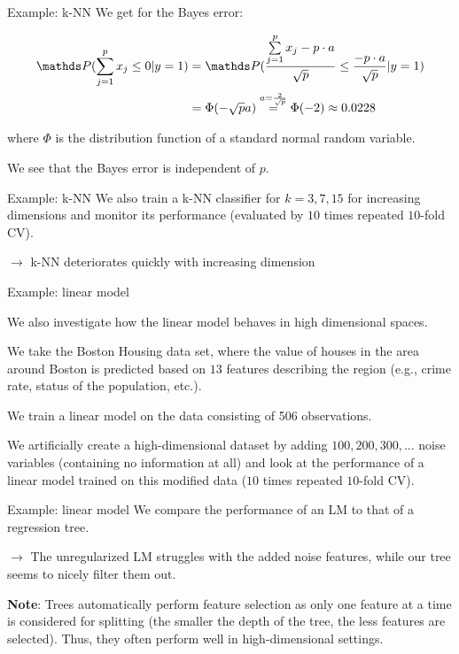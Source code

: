 \documentclass[11pt,compress,t,notes=noshow, xcolor=table]{beamer}
\begin{document}
\begin{framev}{Example: k-NN}
We get for the Bayes error:

\begin{align*}
\P(\sumjp x_j \le 0 | y = 1) &= \P(\frac{\sumjp x_j - p \cdot a}{\sqrt{p}} \le \frac{-p \cdot a}{\sqrt{p}} | y = 1) \\
&= \Phi(-\sqrt{p} a) \overset{a = \frac{2}{\sqrt{p}}}{=} \Phi(-2) \approx 0.0228
\end{align*}

where $\Phi$ is the distribution function of a standard normal random variable.

\vfill

We see that the Bayes error is independent of $p$.
\vfill
\end{framev}

\begin{framev}{Example: k-NN}
We also train a k-NN classifier for $k = 3, 7, 15$ for increasing dimensions and monitor its performance (evaluated by $10$ times repeated $10$-fold CV).

\vfill


$\to$ k-NN deteriorates quickly with increasing dimension
\end{framev}

\begin{framei}{Example: linear model}
\item We also investigate how the linear model behaves in high dimensional spaces.
\item We take the Boston Housing data set, where the value of houses in the area around Boston is predicted based on $13$ features describing the region (e.g., crime rate, status of the population, etc.).
\item We train a linear model on the data consisting of 506 observations.
\item We artificially create a high-dimensional dataset by adding $100, 200, 300, ...$ noise variables (containing no information at all) and look at the performance of a linear model trained on this modified data ($10$ times repeated $10$-fold CV).
\end{framei}

\begin{framev}{Example: linear model}
We compare the performance of an LM to that of a regression tree.


$\rightarrow$ The unregularized LM struggles with the added noise features, while our tree seems to nicely filter them out.

\vfill

\begin{footnotesize}
\textbf{Note}: Trees automatically perform feature selection as only one feature at a time is considered for splitting (the smaller the depth of the tree, the less features are selected). Thus, they often perform well in high-dimensional settings.
\end{footnotesize}
\end{framev}
\end{document}
